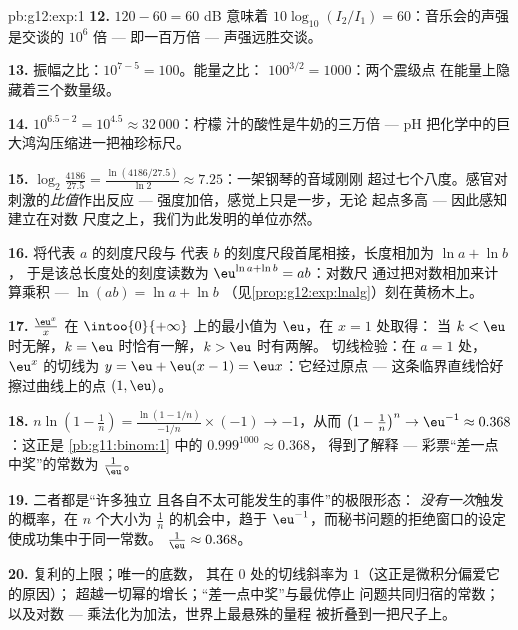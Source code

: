 \begin{solution}{pb:g12:exp:1}
\textbf{12.} $120 - 60 = 60$ dB 意味着
$10\log_{10}(I_2/I_1) = 60$：音乐会的声强
是交谈的 $10^6$ 倍 --- 即一百万倍 ---
声强远胜交谈。

\textbf{13.} 振幅之比：$10^{7-5} = 100$。能量之比：
$100^{3/2} = 1000$：两个震级点
在能量上隐藏着三个数量级。

\textbf{14.} $10^{6.5 - 2} = 10^{4.5} \approx 32\,000$：柠檬
汁的酸性是牛奶的三万倍 --- pH
把化学中的巨大鸿沟压缩进一把袖珍标尺。

\textbf{15.} $\log_2\!\frac{4186}{27.5} =
\frac{\ln(4186/27.5)}{\ln 2} \approx 7.25$：一架钢琴的音域刚刚
超过七个八度。感官对刺激的\emph{比值}作出反应
--- 强度加倍，感觉上只是一步，无论
起点多高 --- 因此感知建立在对数
尺度之上，我们为此发明的单位亦然。

\textbf{16.} 将代表 $a$ 的刻度尺段与
代表 $b$ 的刻度尺段首尾相接，长度相加为 $\ln a + \ln b$，
于是该总长度处的刻度读数为
$\eu^{\ln a + \ln b} = ab$：对数尺
通过把对数相加来计算乘积 --- $\ln(ab) = \ln a + \ln b$
（见\cref{prop:g12:exp:lnalg}）刻在黄杨木上。

\textbf{17.} $\frac{\eu^x}{x}$ 在
$\intoo{0}{+\infty}$ 上的最小值为 $\eu$，在 $x = 1$ 处取得：
当 $k < \eu$ 时无解，$k = \eu$ 时恰有一解，$k > \eu$ 时有两解。
切线检验：在 $a = 1$ 处，$\eu^x$ 的切线为
$y = \eu + \eu(x - 1) = \eu x$：它经过原点
--- 这条临界直线恰好擦过曲线上的点 $(1, \eu)$。

\textbf{18.} $n \ln\!\left(1 - \frac1n\right) =
\frac{\ln(1 - 1/n)}{-1/n} \times (-1) \to -1$，从而
$\left(1 - \frac1n\right)^n \to \eu^{-1} \approx 0.368$：这正是
\cref{pb:g11:binom:1} 中的 $0.999^{1000} \approx 0.368$，
得到了解释 --- 彩票“差一点中奖”的常数为
$\frac1\eu$。

\textbf{19.} 二者都是“许多独立
且各自不太可能发生的事件”的极限形态：
\emph{没有一次}触发的概率，在 $n$ 个大小为 $\frac1n$ 的机会中，趋于
$\eu^{-1}$，而秘书问题的拒绝窗口的设定
使成功集中于同一常数。
$\frac1\eu \approx 0.368$。

\textbf{20.} 复利的上限；唯一的底数，
其在 $0$ 处的切线斜率为 $1$（这正是微积分偏爱它的原因）；
超越一切幂的增长；“差一点中奖”与最优停止
问题共同归宿的常数；以及对数 ---
乘法化为加法，世界上最悬殊的量程
被折叠到一把尺子上。
\end{solution}
